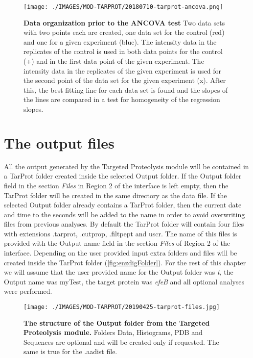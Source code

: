 \begin{figure}[h]
	\centering
	\texttt{[image: ./IMAGES/MOD-TARPROT/20180710-tarprot-ancova.png]}	    
	\caption[Data organization prior to the ANCOVA test]{\textbf{Data organization prior to the ANCOVA test} Two data sets with two points each are created, one data set for the control (red) and one for a given experiment (blue). The intensity data in the replicates of the control is used in both data points for the control (+) and in the first data point of the given experiment. The intensity data in the replicates of the given experiment is used for the second point of the data set for the given experiment (x). After this, the best fitting line for each data set is found and the slopes of the lines are compared in a test for homogeneity of the regression slopes.} 
	\label{fig:enzdigAncova}
	\vspace{-5pt} 	
\end{figure} 

\section{The output files}

All the output generated by the Targeted Proteolysis module will be contained in a TarProt folder created inside the selected Output folder. If the Output folder field in the section \textit{Files} in Region \num{2} of the interface is left empty, then the TarProt folder will be created in the same directory as the data file. If the selected Output folder already contains a TarProt folder, then the current date and time to the seconds will be added to the name in order to avoid overwriting files from previous analyses. By default the TarProt folder will contain four files with extensions .tarprot, .cutprop, .filtpept and uscr. The name of this files is provided with the Output name field in the section \textit{Files} of Region \num{2} of the interface. Depending on the user provided input extra folders and files will be created inside the TarProt folder (\autoref{fig:enzdigFolder}). For the rest of this chapter we will assume that the user provided name for the Output folder was \textit{t}, the Output name was myTest, the target protein was \textit{efeB} and all optional analyses were performed.

\begin{figure}[h]
	\centering
	\texttt{[image: ./IMAGES/MOD-TARPROT/20190425-tarprot-files.jpg]}	    
	\caption[The structure of the Output folder from the Targeted Proteolysis module]{\textbf{The structure of the Output folder from the Targeted Proteolysis module.} Folders Data, Histograms, PDB and Sequences are optional and will be created only if requested. The same is true for the .aadist file.} 
	\label{fig:enzdigFolder}
	\vspace{-5pt} 	
\end{figure} 

